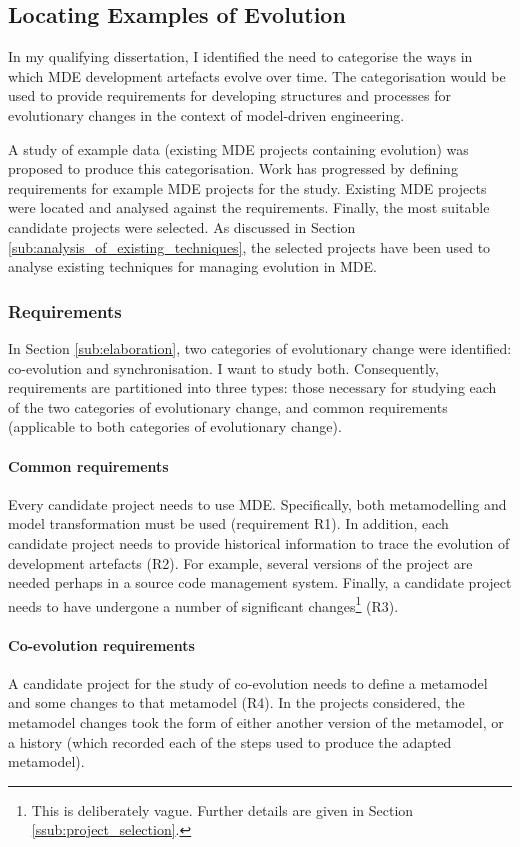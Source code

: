 \subsection{Locating Examples of Evolution}
\label{sub:examples}
In my qualifying dissertation, I identified the need to categorise the ways in which MDE development artefacts evolve over time. The categorisation would be used to provide requirements for developing structures and processes for evolutionary changes in the context of model-driven engineering.

A study of example data (existing MDE projects containing evolution) was proposed to produce this categorisation. Work has progressed by defining requirements for example MDE projects for the study. Existing MDE projects were located and analysed against the requirements. Finally, the most suitable candidate projects were selected. As discussed in Section \ref{sub:analysis_of_existing_techniques}, the selected projects have been used to analyse existing techniques for managing evolution in MDE.

\subsubsection{Requirements} %
\label{ssub:requirements}
In Section \ref{sub:elaboration}, two categories of evolutionary change were identified: co-evolution and synchronisation. I want to study both. Consequently, requirements are partitioned into three types: those necessary for studying each of the two categories of evolutionary change, and common requirements (applicable to both categories of evolutionary change).

\paragraph{Common requirements}
Every candidate project needs to use MDE. Specifically, both metamodelling and model transformation must be used (requirement R1). In addition, each candidate project needs to provide historical information to trace the evolution of development artefacts (R2). For example, several versions of the project are needed perhaps in a source code management system. Finally, a candidate project needs to have undergone a number of significant changes\footnote{This is deliberately vague. Further details are given in Section \ref{ssub:project_selection}.} (R3).

\paragraph{Co-evolution requirements}
A candidate project for the study of co-evolution needs to define a metamodel and some changes to that metamodel (R4). In the projects considered, the metamodel changes took the form of either another version of the metamodel, or a history (which recorded each of the steps used to produce the adapted metamodel).

